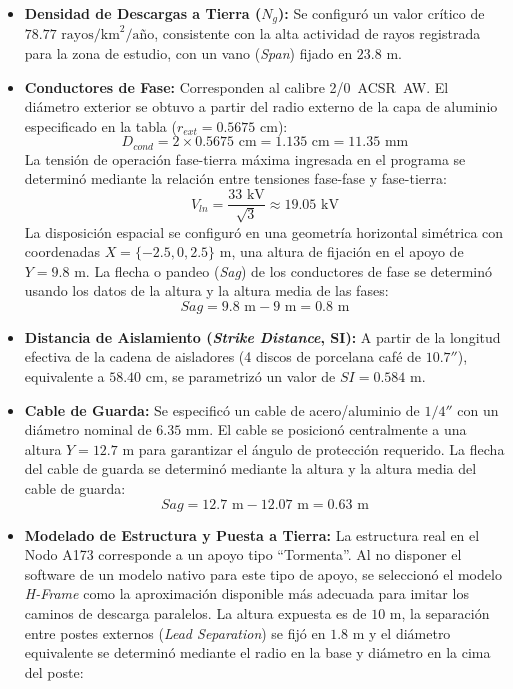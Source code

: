 \documentclass[12pt,letterpaper]{article}
\begin{document}
\begin{itemize}
	\item \textbf{Densidad de Descargas a Tierra ($N_g$):} Se configuró un valor crítico de $78.77\text{ rayos/km}^2/\text{año}$, consistente con la alta actividad de rayos registrada para la zona de estudio, con un vano (\textit{Span}) fijado en $23.8\text{ m}$.
	\item \textbf{Conductores de Fase:} Corresponden al calibre 2/0~ACSR~AW. El diámetro exterior se obtuvo a partir del radio externo de la capa de aluminio especificado en la tabla ($r_{ext} = 0.5675\text{ cm}$):
	\begin{equation}
		D_{cond} = 2 \times 0.5675\text{ cm} = 1.135\text{ cm} = 11.35\text{ mm}
	\end{equation}
	La tensión de operación fase-tierra máxima ingresada en el programa se determinó mediante la relación entre tensiones fase-fase y fase-tierra:
	\begin{equation}
		V_{ln} = \frac{33\text{ kV}}{\sqrt{3}} \approx 19.05\text{ kV}
	\end{equation}
	La disposición espacial se configuró en una geometría horizontal simétrica con coordenadas $X = \{-2.5, 0, 2.5\}\text{ m}$, una altura de fijación en el apoyo de $Y = 9.8\text{ m}$.
	La flecha o pandeo (\textit{Sag}) de los conductores de fase se determinó usando los datos de la altura y la altura media de las fases:
	\begin{equation}
		Sag = 9.8\text{ m} - 9\text{ m} = 0.8\text{ m}
	\end{equation}
	\item \textbf{Distancia de Aislamiento (\textit{Strike Distance}, SI):} A partir de la longitud efectiva de la cadena de aisladores (4 discos de porcelana café de $10.7''$), equivalente a $58.40\text{ cm}$, se parametrizó un valor de $SI = 0.584\text{ m}$.
	\item \textbf{Cable de Guarda:} Se especificó un cable de acero/aluminio de $1/4''$ con un diámetro nominal de $6.35\text{ mm}$. El cable se posicionó centralmente a una altura $Y = 12.7\text{ m}$ para garantizar el ángulo de protección requerido. La flecha del cable de guarda se determinó mediante la altura y la altura media del cable de guarda:
	\begin{equation}
		Sag = 12.7\text{ m} - 12.07\text{ m} = 0.63\text{ m}
	\end{equation}
	\item \textbf{Modelado de Estructura y Puesta a Tierra:} La estructura real en el Nodo A173 corresponde a un apoyo tipo ``Tormenta''. Al no disponer el software de un modelo nativo para este tipo de apoyo, se seleccionó el modelo \textit{H-Frame} como la aproximación disponible más adecuada para imitar los caminos de descarga paralelos. La altura expuesta es de $10\text{ m}$, la separación entre postes externos (\textit{Lead Separation}) se fijó en $1.8\text{ m}$ y el diámetro equivalente se determinó mediante el radio en la base y diámetro en la cima del poste:

\end{itemize}
\end{document}
